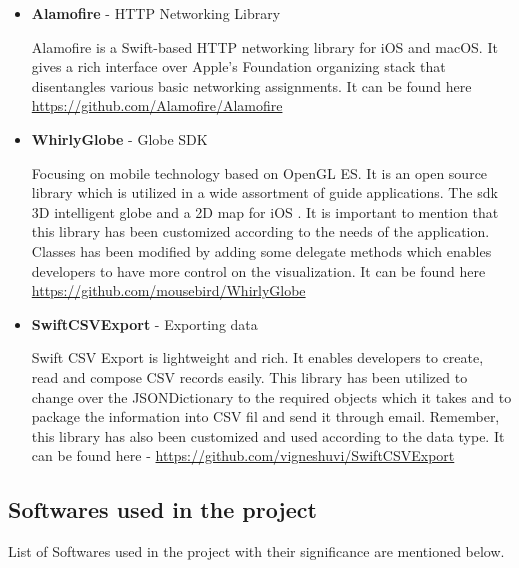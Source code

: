 \begin{itemize}
    \item \textbf{Alamofire} - HTTP Networking Library
    
    Alamofire is a Swift-based HTTP networking library for \gls{iOS} and \gls{macOS}. It gives a rich interface over Apple's Foundation organizing stack that disentangles various basic networking assignments\cite{Alamofire}. It can be found here \url{https://github.com/Alamofire/Alamofire} \\
   
    \item \textbf{WhirlyGlobe} - Globe SDK
    
    Focusing on mobile technology based on OpenGL ES. It is an open source library which is utilized in a wide assortment of guide applications. The \gls{sdk} 3D intelligent globe and a 2D map for \gls{iOS} \cite{WhirlyGlobe}. It is important to mention that this library has been customized according to the needs of the application. Classes has been modified by adding some delegate methods which enables developers to have more control on the visualization. It can be found here  \url{https://github.com/mousebird/WhirlyGlobe} \\
    
    \item \textbf{SwiftCSVExport} - Exporting data
    
    Swift CSV Export is lightweight and rich. It enables developers to create, read and compose CSV records easily\cite{Swift_CSV_Export}. This library has been utilized to change over the JSONDictionary to the required objects which it takes and to package the information into CSV fil and send it through email. Remember, this library has also been customized and used according to the data type. It can be found here 
    - \url{https://github.com/vigneshuvi/SwiftCSVExport} \\ 
    
\end{itemize}

\subsection{Softwares used in the project}

List of Softwares used in the project with their significance are mentioned below.

